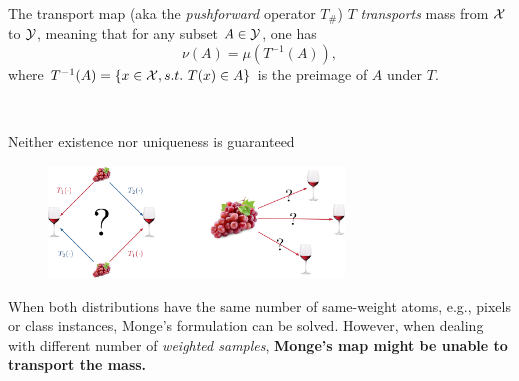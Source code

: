 \documentclass[pdf,aspectratio=169,10pt]{beamer}
\begin{document}
\begin{frame}{The transport map (aka the \emph{pushforward} operator $T_\#$)}
    $T$ \emph{transports} mass from ${\mathcal{X}}$ to ${\mathcal{Y}}$, meaning that for any subset $A\in{\mathcal{Y}}$, one has 
    \begin{equation}
        \nu(A) = \mu(T^{-1}(A)),
    \end{equation}
    where $T^{-1}(A)=\{x\in{\mathcal{X}}, s.t.\ T(x)\in A \}$ is the preimage of $A$ under $T$.
\vspace{2em}

\\
\end{frame}






\begin{frame}{ Neither existence nor uniqueness is guaranteed}
        \begin{figure}
        \includegraphics[width=0.7\textwidth]{../img/existence_uniqueness.pdf}
    \end{figure}
    \vspace{1em}
 When both distributions have the same number of same-weight atoms, e.g., pixels or class instances, Monge's formulation can be solved. However, when dealing with different number of \emph{weighted samples}, \textbf{Monge's map might be unable to transport the mass.}
\end{frame}
\end{document}
